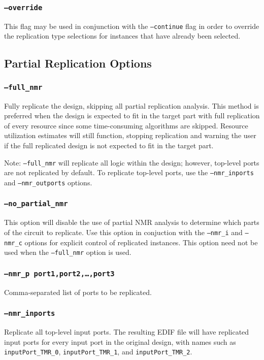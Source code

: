 \subsubsection{\texttt{--override}}
This flag may be used in conjunction with the \texttt{--continue} flag in order
to override the replication type selections for instances that have already been
selected.

\subsection{Partial Replication Options}

\subsubsection{\texttt{--full\_nmr}}
Fully replicate the design, skipping all partial replication analysis. This
method is preferred when the design is expected to fit in the target part with
full replication of every resource since some time-consuming algorithms are skipped.
Resource utilization estimates will still function, stopping replication and 
warning the user if the full replicated design is not expected to fit in the 
target part.

Note: \texttt{--full\_nmr} will replicate all logic within the design; however, 
top-level ports are not replicated by default. To replicate top-level ports,
use the \texttt{--nmr\_inports} and \texttt{--nmr\_outports} options.

\subsubsection{\texttt{--no\_partial\_nmr}}
This option will disable the use of partial NMR analysis to determine which
parts of the circuit to replicate. Use this option in conjuction with the
\texttt{--nmr\_i} and \texttt{--nmr\_c} options for explicit control of
replicated instances. This option need not be used when the \texttt{--full\_nmr}
option is used.

\subsubsection{\texttt{--nmr\_p port1,port2,\ldots,port3}}
Comma-separated list of ports to be replicated.

\subsubsection{\texttt{--nmr\_inports}}
Replicate all top-level input ports. The resulting EDIF file will
have replicated input ports for every input port in the original design, with
names such as \texttt{inputPort\_TMR\_0}, \texttt{inputPort\_TMR\_1},
and \texttt{inputPort\_TMR\_2}.

